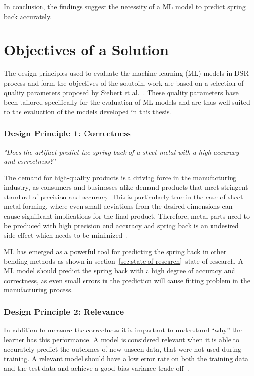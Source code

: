 In conclusion, the findings suggest the necessity of a \ac{ML} model to predict spring
back accurately.


\section{Objectives of a Solution}\label{sec:objectives-of-a-solution}
The design principles used to evaluate the machine learning (ML) models in \ac{DSR}
process and form the objectives of the solutoin.
work are based on a selection of quality parameters proposed by
Siebert et al.~\cite{siebert2022construction}.
These quality parameters have been tailored specifically for the evaluation of ML
models and are thus well-suited to the evaluation of the models developed in this
thesis.

\subsubsection*{Design Principle 1: Correctness}
\textit{"Does the artifact predict the spring back of a sheet metal with a
high accuracy and
correctness?"}~\cite[p. 16]{siebert2022construction}

The demand for high-quality products is a driving force in the manufacturing industry,
as consumers and businesses alike demand products that meet stringent standard of
precision and accuracy.
This is particularly true in the case of sheet metal forming, where even small
deviations from the desired dimensions can cause significant implications for the final
product.
Therefore, metal parts need to be produced with high precision and accuracy and
spring back is an undesired side effect which needs to be minimized~\cite[p.1]{
    cruz_applicationmachinelearning_2021}.

\ac{ML} has emerged as a powerful tool for predicting the spring back in other bending
methods as shown in section~\ref{sec:state-of-research}~state of research.
A \ac{ML} model should predict the spring back with a high degree of accuracy and
correctness, as even small errors in the prediction will cause fitting problem in the
manufacturing process.

\subsubsection*{Design Principle 2: Relevance}
In addition to measure the correctness it is important to understand ``why''
the learner has this performance.
A model is considered relevant when it is able to accurately predict the outcomes of
new unseen data, that were not used during training.
A relevant model should have a low error rate on both the training data and the test
data and achieve a good bias-variance trade-off~\cite[p. 16]{siebert2022construction}.

